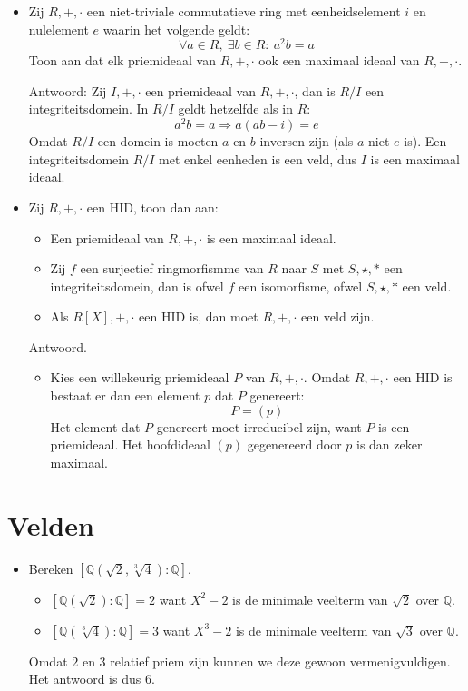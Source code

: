 \documentclass[main.tex]{subfiles}
\begin{document}
 \begin{itemize}
 \item Zij $R,+,\cdot$ een niet-triviale commutatieve ring met eenheidselement $i$ en nulelement $e$ waarin het volgende geldt:
   \[ \forall a\in R,\ \exists b\in R:\ a^{2}b=a \]
   Toon aan dat elk priemideaal van $R,+,\cdot$ ook een maximaal ideaal van $R,+,\cdot$.

   Antwoord:
   Zij $I,+,\cdot$ een priemideaal van $R,+,\cdot$, dan is $R/I$ een integriteitsdomein.
   In $R/I$ geldt hetzelfde als in $R$:
   \[ a^{2}b=a \Rightarrow a(ab-i)=e \]
   Omdat $R/I$ een domein is moeten $a$ en $b$ inversen zijn (als $a$ niet $e$ is).
   Een integriteitsdomein $R/I$ met enkel eenheden is een veld, dus $I$ is een maximaal ideaal.
 \item Zij $R,+,\cdot$ een HID, toon dan aan:
   \begin{itemize}
   \item Een priemideaal van $R,+,\cdot$ is een maximaal ideaal.
   \item Zij $f$ een surjectief ringmorfismme van $R$ naar $S$ met $S,\star,*$ een integriteitsdomein, dan is ofwel $f$ een isomorfisme, ofwel $S,\star,*$ een veld.
   \item Als $R[X],+,\cdot$ een HID is, dan moet $R,+,\cdot$ een veld zijn.
   \end{itemize}

   Antwoord.
   \begin{itemize}
   \item 
     Kies een willekeurig priemideaal $P$ van $R,+,\cdot$.
     Omdat $R,+,\cdot$ een HID is bestaat er dan een element $p$ dat $P$ genereert:
     \[ P = (p) \]
     Het element dat $P$ genereert moet irreducibel zijn, want $P$ is een priemideaal.
     Het hoofdideaal $(p)$ gegenereerd door $p$ is dan zeker maximaal. 
   \end{itemize}
 \end{itemize}

 \section{Velden}
 \label{sec:velden}

 \begin{itemize}
 \item Bereken $[\mathbb{Q}(\sqrt{2},\sqrt[3]{4}):\mathbb{Q}]$.
   \begin{itemize}
   \item $[\mathbb{Q}(\sqrt{2}):\mathbb{Q}] = 2$ want $X^{2}-2$ is de minimale veelterm van $\sqrt{2}$ over $\mathbb{Q}$.
   \item $[\mathbb{Q}(\sqrt[3]{4}):\mathbb{Q}] = 3$ want $X^{3}-2$ is de minimale veelterm van $\sqrt{3}$ over $\mathbb{Q}$.
   \end{itemize}
   Omdat $2$ en $3$ relatief priem zijn kunnen we deze gewoon vermenigvuldigen.
   Het antwoord is dus $6$.
 \end{itemize}
\end{document}

